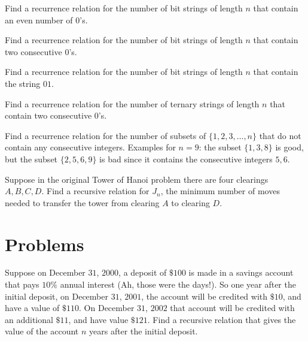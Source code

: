 \begin{exer}
Find a recurrence relation for the number of bit strings of length $n$ that contain an even number of $0$'s.
\end{exer}

\begin{exer}
Find a recurrence relation for the number of bit strings of length $n$ that contain two consecutive $0$'s.
\end{exer}

\begin{exer}
Find a recurrence relation for the number of bit strings of length $n$ that contain the string $01$.
\end{exer}

\begin{exer}
Find a recurrence relation for the number of ternary strings of length $n$ that contain two consecutive $0$'s.
\end{exer}

\begin{exer}
Find a recurrence relation for the number of subsets of $\{1,2,3,\ldots,n\}$ that do not contain any consecutive integers.
Examples for $n = 9$: the subset $\{1,3,8\}$ is good, but the subset $\{ 2, 5,6,9\}$ is bad since it contains the consecutive integers $5,6$.
\end{exer}


\begin{exer}
Suppose in the original Tower of Hanoi problem there are four clearings $A,B,C,D$. Find a recursive relation for $J_n$, the minimum number of moves needed to transfer 
the tower from clearing $A$ to clearing $D$.
\end{exer}

\section{Problems}

\begin{prob}
Suppose on December $31$, $2000$, a deposit of $\$100$ is made in a savings account that pays $10\%$ annual interest (Ah, those were the days!). So one year after 
the initial deposit, on  December $31$, $2001$, the account will be credited with $\$10$, and have a value of $\$110$. On  December $31$, $2002$ that account will be credited 
with an additional $\$11$, and have value $\$121$. Find a recursive relation that gives the value of the account $n$ years after the initial deposit.
\end{prob}

